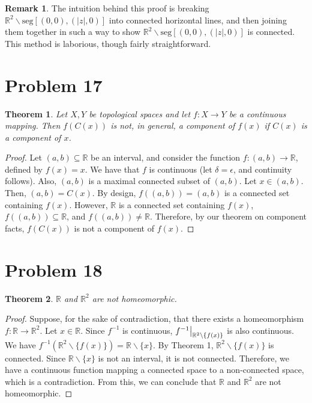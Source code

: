 \documentclass[10pt,a4paper]{article}
\theoremstyle{theorem}
\newtheorem{theorem}{Theorem}
\newcommand\restr[2]{{%
  \left.\kern-\nulldelimiterspace %
  #1 %
  \vphantom{\big|} %
  \right|_{#2} %
  }}
\theoremstyle{definition}
\newtheorem{remark}{Remark}
\begin{document}
\begin{remark}
The intuition behind this proof is breaking $\mathbb{R}^2 \backslash \text{seg}[(0, 0), (|z|, 0)]$ into connected horizontal lines, and then joining them together in such a way to show $\mathbb{R}^2 \backslash \text{seg}[(0, 0), (|z|, 0)]$ is connected. This method is laborious, though fairly straightforward.
\end{remark}

\section*{Problem 17}
\begin{theorem}
Let $X, Y$ be topological spaces and let $f:X \to Y$ be a continuous mapping.  Then $f(C(x))$ is not, in general, a component of $f(x)$ if $C(x)$ is a component of $x$. 
\end{theorem}

\begin{proof}
Let $(a, b) \subseteq \mathbb{R}$ be an interval, and consider the function $f:(a, b) \to \mathbb{R}$, defined by $f(x) = x$. We have that $f$ is continuous (let $\delta = \epsilon$, and continuity follows). Also, $(a, b)$ is a maximal connected subset of $(a, b)$.  Let $x \in (a, b)$. Then,  $(a, b) = C(x)$.  By design, $f((a, b)) = (a, b)$ is a connected set containing $f(x)$. However, $\mathbb{R}$ is a connected set containing $f(x)$,  $f((a, b)) \subseteq \mathbb{R}$, and $f((a, b)) \not = \mathbb{R}$. Therefore, by our theorem on component facts, $f(C(x))$ is not a component of $f(x)$.
\end{proof}

\section*{Problem 18}
\begin{theorem}
$\mathbb{R}$ and $\mathbb{R}^2$ are not homeomorphic.
\end{theorem}

\begin{proof}
Suppose, for the sake of contradiction, that there exists a homeomorphism $f: \mathbb{R} \to \mathbb{R}^2$.  Let $x \in \mathbb{R}$. Since $f^{-1}$ is continuous, $\restr{f^{-1}}{\mathbb{R}^2 \backslash \{f(x)\}}$ is also continuous.  We have $f^{-1}(\mathbb{R}^2 \backslash \{f(x)\}) = \mathbb{R} \backslash \{x\}$. By Theorem 1, $\mathbb{R}^2 \backslash \{f(x)\}$ is connected. Since $\mathbb{R} \backslash \{x\}$ is not an interval, it is not connected. Therefore, we have a continuous function mapping a connected space to a non-connected space, which is a contradiction.  From this, we can conclude that $\mathbb{R}$ and $\mathbb{R}^2$ are not homeomorphic.
\end{proof}
\end{document}
